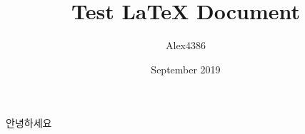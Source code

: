 \documentclass[12pt, letterpaper]{article}
\title{Test LaTeX Document}
\author{Alex4386}
\date{September 2019}
\begin{document}
\maketitle

안녕하세요
\end{document}

